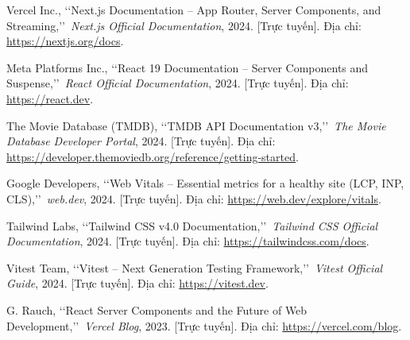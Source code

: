 \documentclass[13pt,a4paper]{extarticle}
\begin{document}
\begin{enumerate}[label={[\arabic*]}, leftmargin=1.2cm, itemsep=6pt, parsep=0pt]
\item Vercel Inc., \lq\lq Next.js Documentation -- App Router, Server Components, and Streaming,\rq\rq\ \textit{Next.js Official Documentation}, 2024. [Trực tuyến]. Địa chỉ: \url{https://nextjs.org/docs}.
\item Meta Platforms Inc., \lq\lq React 19 Documentation -- Server Components and Suspense,\rq\rq\ \textit{React Official Documentation}, 2024. [Trực tuyến]. Địa chỉ: \url{https://react.dev}.
\item The Movie Database (TMDB), \lq\lq TMDB API Documentation v3,\rq\rq\ \textit{The Movie Database Developer Portal}, 2024. [Trực tuyến]. Địa chỉ: \url{https://developer.themoviedb.org/reference/getting-started}.
\item Google Developers, \lq\lq Web Vitals -- Essential metrics for a healthy site (LCP, INP, CLS),\rq\rq\ \textit{web.dev}, 2024. [Trực tuyến]. Địa chỉ: \url{https://web.dev/explore/vitals}.
\item Tailwind Labs, \lq\lq Tailwind CSS v4.0 Documentation,\rq\rq\ \textit{Tailwind CSS Official Documentation}, 2024. [Trực tuyến]. Địa chỉ: \url{https://tailwindcss.com/docs}.
\item Vitest Team, \lq\lq Vitest -- Next Generation Testing Framework,\rq\rq\ \textit{Vitest Official Guide}, 2024. [Trực tuyến]. Địa chỉ: \url{https://vitest.dev}.
\item G. Rauch, \lq\lq React Server Components and the Future of Web Development,\rq\rq\ \textit{Vercel Blog}, 2023. [Trực tuyến]. Địa chỉ: \url{https://vercel.com/blog}.
\end{enumerate}
\end{document}
